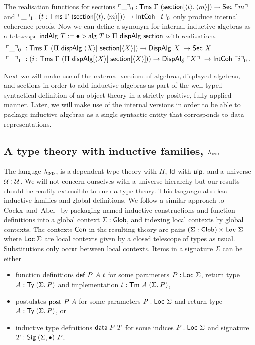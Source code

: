 The realisation functions for sections
$\emb{\_}_0 : \Tms\ \Gamma\ (\mta{section}[\Msub{t},\Msub{m}]) \to \mta{Sec}\ \emb{m}$ and
$\emb{\_}_1 : (t : \Tms\ \Gamma\ (\mta{section}[\Msub{t},\Msub{m}])) \to \mta{IntCoh}\ \emb{t}_0$
only produce internal coherence proofs.
Now we can define a synonym for internal inductive algebras as a telescope $\textsf{indAlg}\ T := \bullet \rhd \textsf{alg}\ T \rhd \Pi\ \textsf{dispAlg}\ \textsf{section}$
with realisations
\begin{align*}
    &\emb{\_}_0\ : \mta{Tms}\ \Gamma\ (\Pi\ \mta{dispAlg}[\Msub X]\ \mta{section}[\Msub X]) \to \mta{DispAlg}\ X\ \to \mta{Sec}\ X \\
    &\emb{\_}_1\ : (i : \mta{Tms}\ \Gamma\ (\Pi\ \mta{dispAlg}[\Msub X]\ \mta{section}[\Msub X])) \to \mta{DispAlg}\ \emb{X}\ \to \mta{IntCoh}\ \emb{i}_0 \,.
\end{align*}


Next we will make use of the external versions of algebras, displayed algebras,
and sections in order to add inductive algebras as part of the well-typed
syntactical definition of an object theory in a strictly-positive, fully-applied
manner. Later, we will make use of the internal versions in order to be able to
package inductive algebras as a single syntactic entity that corresponds to data
representations.

\subsection{A type theory with inductive families, $\lambda_{\textsc{ind}}$}\label{sub:lambdaind}

The languge $\lambda_{\textsc{ind}}$, is a dependent type theory with $\Pi$, $\textsf{Id}$ with
$\textsf{uip}$, and a universe $\mathcal{U} : \mathcal{U}$. We will not concern ourselves with a
universe hierarchy but our results should be readily extensible to such a type
theory. This language also has inductive families and global definitions. We
follow a similar approach
to Cockx~and~Abel~\cite{Cockx2018-fk} by packaging named inductive constructions
and function definitions into a global context $\Sigma : \textsf{Glob}$, and indexing local contexts
by global contexts. The contexts $\textsf{Con}$ in the resulting theory are pairs $(\Sigma :
\textsf{Glob}) \times \textsf{Loc}\ \Sigma$ where $\textsf{Loc}\ \Sigma$ are local contexts given by a
closed telescope of types as usual. Substitutions only occur between local contexts.
Items in a signature $\Sigma$ can be either

\begin{itemize}
	\item function definitions $\mta{def}\ P\ A\ t$ for some parameters $P : \textsf{Loc}\
		      \Sigma$, return type $A : \textsf{Ty}\ (\Sigma, P)$ and implementation $t : \textsf{Tm}\ A\ (\Sigma, P)$,
	\item postulates $\textsf{post}\ P\ A$ for some parameters $P : \textsf{Loc}\
		      \Sigma$ and return type $A : \textsf{Ty}\ (\Sigma, P)$, or
	\item inductive type definitions $\mta{data}\ P\ T$ for some indices $P :
		      \textsf{Loc}\ \Sigma$ and signature $T : \textsf{Sig}\ (\Sigma, \bullet)\ P$.
\end{itemize}


